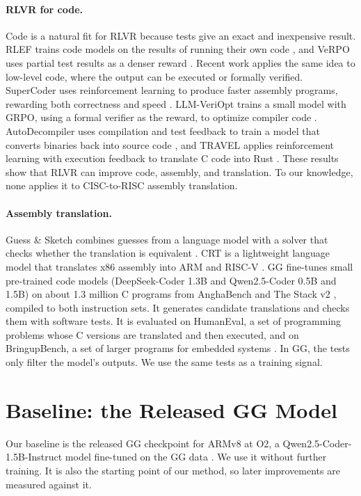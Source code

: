 \documentclass{article}
\begin{document}
\paragraph{RLVR for code.}
Code is a natural fit for RLVR because tests give an exact and inexpensive result. RLEF trains code models on the results of running their own code \citep{rlef}, and VeRPO uses partial test results as a denser reward \citep{verpo}. Recent work applies the same idea to low-level code, where the output can be executed or formally verified. SuperCoder uses reinforcement learning to produce faster assembly programs, rewarding both correctness and speed \citep{supercoder}. LLM-VeriOpt trains a small model with GRPO, using a formal verifier as the reward, to optimize compiler code \citep{veriopt}. AutoDecompiler uses compilation and test feedback to train a model that converts binaries back into source code \citep{autodecompiler}, and TRAVEL applies reinforcement learning with execution feedback to translate C code into Rust \citep{travel}. These results show that RLVR can improve code, assembly, and translation. To our knowledge, none applies it to CISC-to-RISC assembly translation.

\paragraph{Assembly translation.}
Guess \& Sketch combines guesses from a language model with a solver that checks whether the translation is equivalent \citep{guesssketch}. CRT is a lightweight language model that translates x86 assembly into ARM and RISC-V \citep{crt}. GG fine-tunes small pre-trained code models (DeepSeek-Coder 1.3B and Qwen2.5-Coder 0.5B and 1.5B) on about 1.3 million C programs from AnghaBench \citep{anghabench} and The Stack v2 \citep{stackv2}, compiled to both instruction sets. It generates candidate translations and checks them with software tests. It is evaluated on HumanEval, a set of programming problems whose C versions are translated and then executed, and on BringupBench, a set of larger programs for embedded systems \citep{gg}. In GG, the tests only filter the model's outputs. We use the same tests as a training signal.

\section{Baseline: the Released GG Model}
\label{sec:baseline}

Our baseline is the released GG checkpoint for ARMv8 at O2, a Qwen2.5-Coder-1.5B-Instruct model \citep{qwen25coder} fine-tuned on the GG data \citep{gg}. We use it without further training. It is also the starting point of our method, so later improvements are measured against it.
\end{document}
